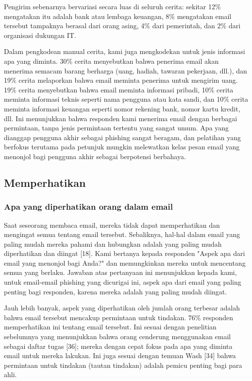 \documentclass[lettersize,journal]{IEEEtran}
\begin{document}
Pengirim sebenarnya bervariasi secara luas di seluruh cerita: sekitar 12\% mengatakan itu adalah bank atau lembaga keuangan, 8\% mengatakan email tersebut tampaknya berasal dari orang asing, 4\% dari pemerintah, dan 2\% dari organisasi dukungan IT.

Dalam pengkodean manual cerita, kami juga mengkodekan untuk jenis informasi apa yang diminta. 30\% cerita menyebutkan bahwa penerima email akan menerima semacam barang berharga (uang, hadiah, tawaran pekerjaan, dll.), dan 19\% cerita melaporkan bahwa email meminta penerima untuk mengirim uang. 19\% cerita menyebutkan bahwa email meminta informasi pribadi, 10\% cerita meminta informasi teknis seperti nama pengguna atau kata sandi, dan 10\% cerita meminta informasi keuangan seperti nomor rekening bank, nomor kartu kredit, dll. Ini menunjukkan bahwa responden kami menerima email dengan berbagai permintaan, tanpa jenis permintaan tertentu yang sangat umum. Apa yang dianggap pengguna akhir sebagai phishing sangat beragam, dan pelatihan yang berfokus terutama pada petunjuk mungkin melewatkan kelas pesan email yang menonjol bagi pengguna akhir sebagai berpotensi berbahaya.

\subsection{Memperhatikan}

\subsubsection{Apa yang diperhatikan orang dalam email}

Saat seseorang membaca email, mereka tidak dapat memperhatikan dan mengingat semua tentang email tersebut. Sebaliknya, hal-hal dalam email yang paling mudah mereka pahami dan hubungkan adalah yang paling mudah diperhatikan dan diingat [18]. Kami bertanya kepada responden "Aspek apa dari email yang menonjol bagi Anda?" dan memungkinkan mereka untuk mencentang semua yang berlaku. Jawaban atas pertanyaan ini menunjukkan kepada kami, untuk email-email phishing yang dicurigai ini, aspek apa dari email yang paling penting bagi responden, karena mereka adalah yang paling mudah diingat.

Jauh lebih banyak, aspek yang diperhatikan oleh jumlah orang terbesar adalah bahwa email tersebut mencakup permintaan untuk tindakan. 76\% responden memperhatikan ini tentang email tersebut. Ini sesuai dengan penelitian sebelumnya yang menunjukkan bahwa orang cenderung menggunakan email sebagai daftar tugas [36]; mereka dengan cepat fokus pada apa yang diminta email untuk mereka lakukan. Ini juga sesuai dengan temuan Wash [34] bahwa permintaan untuk tindakan (tautan tindakan) adalah pemicu penting bagi para ahli.
\end{document}
